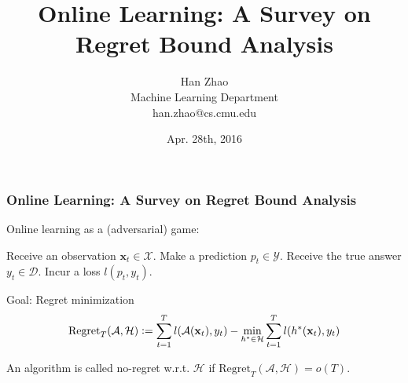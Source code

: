 \documentclass{beamer}
\title[]{Online Learning: A Survey on Regret Bound Analysis}
\author[Han Zhao]{Han Zhao \\ Machine Learning Department \\ han.zhao@cs.cmu.edu}
\institute{\texttt{[image: cmu\_logo\_red]}}
\date{{Apr. 28th, 2016}}
\begin{document}
\begin{frame}
	\titlepage
\end{frame}

\newcommand{\defeq}{\vcentcolon=}
\newcommand{\eqdef}{=\vcentcolon}
\newcommand{\Reg}{\text{Regret}}

\begin{frame}
\frametitle{Online Learning: A Survey on Regret Bound Analysis}
Online learning as a (adversarial) game:
\vspace*{-2pt}
\begin{algorithmic}[1]
	\STATE	Receive an observation $\mathbf{x}_t\in\mathcal{X}$.
	\STATE 	Make a prediction $p_t\in\mathcal{Y}$.
	\STATE	Receive the true answer $y_t\in\mathcal{D}$.
	\STATE	Incur a loss $l(p_t, y_t)$.
\ENDFOR
\end{algorithmic}
Goal: Regret minimization
$$\Reg_T(\mathcal{A}, \mathcal{H})\defeq  \sum_{t=1}^T l(\mathcal{A}(\mathbf{x}_t), y_t) - \min_{h^*\in \mathcal{H}}\sum_{t=1}^T l(h^*(\mathbf{x}_t), y_t)$$

An algorithm is called no-regret w.r.t. $\mathcal{H}$ if $\Reg_T(\mathcal{A}, \mathcal{H}) = o(T)$.
\end{frame}
\end{document}
